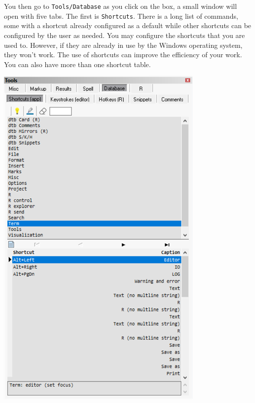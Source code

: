 You then go to \texttt{Tools/Database} as you click on the box, a small window will open with five tabs.
The first is \texttt{Shortcuts}. There is a long list of commands, some with a shortcut already configured
as a default while other shortcuts can be configured by the user as needed.
You may configure the shortcuts that you are used to. However,
if they are already in use by the Windows operating system, they won't work.
The use of shortcuts can improve the efficiency of your work. You can also have more than one shortcut table.

\vspace{5mm}
\includegraphics[scale=0.60]{./res/tools_database_shortcuts.png}~~

